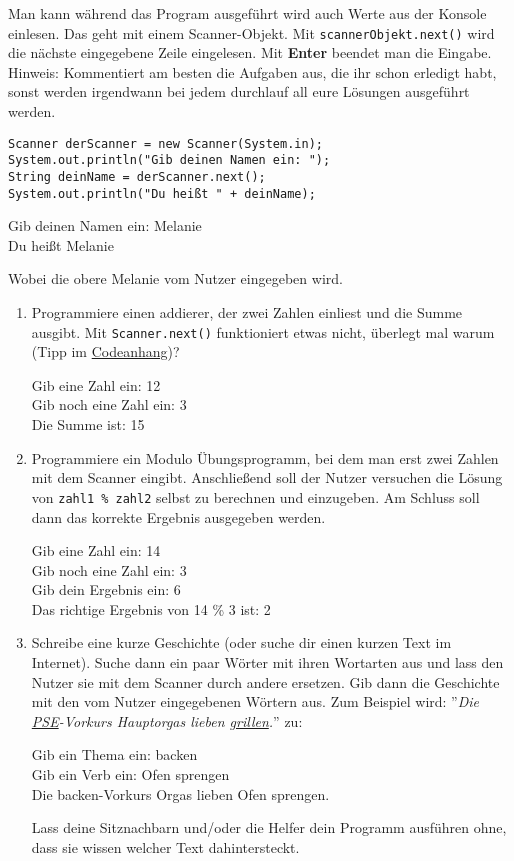 \documentclass{../../sheet}
\begin{document}
\newpage
{}
Man kann während das Program ausgeführt wird auch Werte aus der Konsole einlesen. Das geht mit einem Scanner-Objekt. Mit \texttt{scannerObjekt.next()} wird die nächste eingegebene Zeile eingelesen. Mit \textbf{Enter} beendet man die Eingabe.\\
Hinweis: Kommentiert am besten die Aufgaben aus, die ihr schon erledigt habt, sonst werden irgendwann bei jedem durchlauf all eure Lösungen ausgeführt werden.
\begin{verbatim}
Scanner derScanner = new Scanner(System.in);
System.out.println("Gib deinen Namen ein: ");
String deinName = derScanner.next();
System.out.println("Du heißt " + deinName);
\end{verbatim}
\begin{ausgabe}
  Gib deinen Namen ein: Melanie\\
  Du heißt Melanie
\end{ausgabe}
Wobei die obere Melanie vom Nutzer eingegeben wird.

\begin{enumerate}
  \item Programmiere einen addierer, der zwei Zahlen einliest und die Summe ausgibt. Mit \texttt{Scanner.next()} funktioniert etwas nicht, überlegt mal warum (Tipp im \hyperlink{Aufgabe_2.1}{Codeanhang})?
        \begin{ausgabe}
          Gib eine Zahl ein: 12\\
          Gib noch eine Zahl ein: 3\\
          Die Summe ist: 15
        \end{ausgabe}
  \item Programmiere ein Modulo Übungsprogramm, bei dem man erst zwei Zahlen mit dem Scanner eingibt. Anschließend soll der Nutzer versuchen die Lösung von \texttt{zahl1 \% zahl2} selbst zu berechnen und einzugeben. Am Schluss soll dann das korrekte Ergebnis ausgegeben werden.
        \begin{ausgabe}
          Gib eine Zahl ein: 14\\
          Gib noch eine Zahl ein: 3\\
          Gib dein Ergebnis ein: 6\\
          Das richtige Ergebnis von 14 \% 3 ist: 2
        \end{ausgabe}
  \item Schreibe eine kurze Geschichte (oder suche dir einen kurzen Text im Internet). Suche dann ein paar Wörter mit ihren Wortarten aus und lass den Nutzer sie mit dem Scanner durch andere ersetzen. Gib dann die Geschichte mit den vom Nutzer eingegebenen Wörtern aus. Zum Beispiel wird: ''\textit{Die \underline{PSE}-Vorkurs Hauptorgas lieben \underline{grillen}.}'' \space zu:
        \begin{ausgabe}
          Gib ein Thema ein: backen\\
          Gib ein Verb ein: Ofen sprengen\\
          Die backen-Vorkurs Orgas lieben Ofen sprengen.
        \end{ausgabe}
        Lass deine Sitznachbarn und/oder die Helfer dein Programm ausführen ohne, dass sie wissen welcher Text dahintersteckt.
\end{enumerate}
\end{document}
